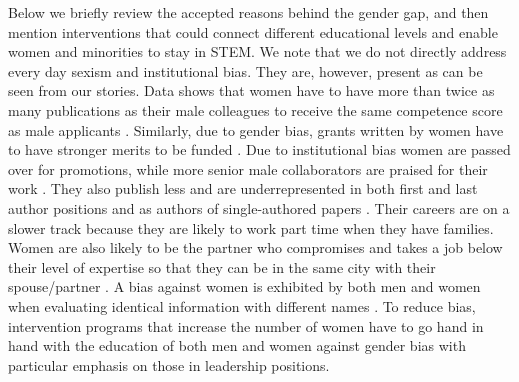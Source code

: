 \documentclass[utf8]{frontiersSCNS} %
\begin{document}
 Below we briefly review the accepted reasons behind the gender gap, and then mention interventions that could connect different educational levels and enable women and minorities to stay in STEM. We note that we do not directly address every day sexism and institutional bias.  They are, however, present as can be seen from our stories. Data shows that women have to have more than twice as many publications as their male colleagues to receive the same competence score as male applicants \citep{christine1997nepotism}. Similarly, due to gender bias, grants written by women have to have stronger merits to be funded \citep{bornmann2007gender}. Due to institutional bias women are passed over for promotions, while more senior male collaborators are praised for their work \citep{rickard2015slower}. They also publish less and are underrepresented in both first and last author positions and as authors of single-authored papers \citep{west2013role}. Their careers are on a slower track because they are likely to work part time when they have families. Women are also likely to be the partner who compromises and takes a job below their level of expertise so that they can be in the same city with their spouse/partner \citep{rickard2015slower}.  A bias against women is exhibited by both men and women when evaluating identical information with different names \citep{christine1997nepotism,bornmann2007gender,rickard2015slower}. To reduce bias, intervention programs that increase the number of women have to go hand in hand with the education of both men and women against gender bias with particular emphasis on those in leadership positions. 
 
\end{document}
